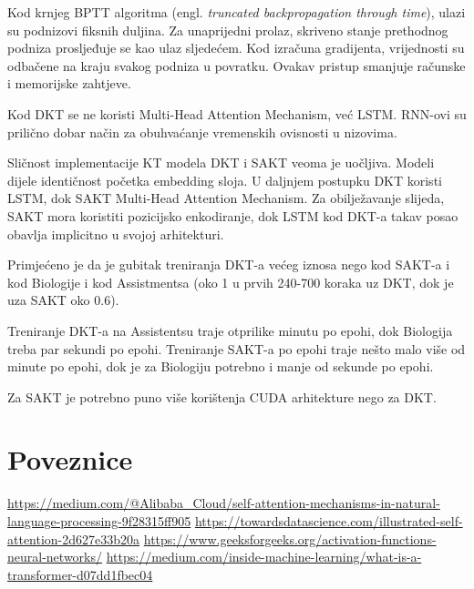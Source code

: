		Kod krnjeg BPTT algoritma (engl. \textit{truncated backpropagation through time}), ulazi su podnizovi fiksnih duljina. Za unaprijedni prolaz, skriveno stanje prethodnog podniza prosljeđuje se kao ulaz sljedećem. Kod izračuna gradijenta, vrijednosti su odbačene na kraju svakog podniza u povratku. Ovakav pristup smanjuje računske i memorijske zahtjeve.

		Kod DKT se ne koristi Multi-Head Attention Mechanism, već LSTM. RNN-ovi su prilično dobar način za obuhvaćanje vremenskih ovisnosti u nizovima.

		Sličnost implementacije KT modela DKT i SAKT veoma je uočljiva. Modeli dijele identičnost početka embedding sloja. U daljnjem postupku DKT koristi LSTM, dok SAKT Multi-Head Attention Mechanism. Za obilježavanje slijeda, SAKT mora koristiti pozicijsko enkodiranje, dok LSTM kod DKT-a takav posao obavlja implicitno u svojoj arhitekturi.
	
		Primjećeno je da je gubitak treniranja DKT-a većeg iznosa nego kod SAKT-a i kod Biologije i kod Assistmentsa (oko 1 u prvih 240-700 koraka uz DKT, dok je uza SAKT oko 0.6). 

		Treniranje DKT-a na Assistentsu traje otprilike minutu po epohi, dok Biologija treba par sekundi po epohi.
		Treniranje SAKT-a po epohi traje nešto malo više od minute po epohi, dok je za Biologiju potrebno i manje od sekunde po epohi.

		Za SAKT je potrebno puno više korištenja CUDA arhitekture nego za DKT.

		
	\section{Poveznice}
\url{https://medium.com/@Alibaba_Cloud/self-attention-mechanisms-in-natural-language-processing-9f28315ff905}
\url{https://towardsdatascience.com/illustrated-self-attention-2d627e33b20a}
\url{https://www.geeksforgeeks.org/activation-functions-neural-networks/}
\url{https://medium.com/inside-machine-learning/what-is-a-transformer-d07dd1fbec04}


